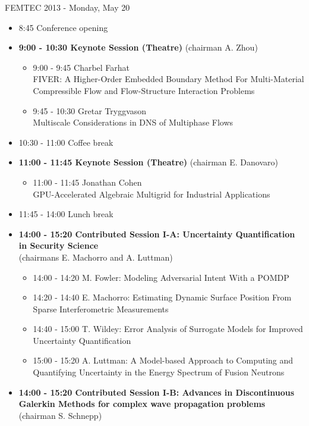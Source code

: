 \documentclass[10pt]{article}%
\begin{document}
\centerline{\huge FEMTEC 2013 - Monday, May 20}
\vspace{4mm}

\begin{itemize}    
  \item 8:45 Conference opening
  \item {\bf 9:00 - 10:30 Keynote Session (Theatre)} (chairman A. Zhou) 
  \begin{itemize}
    \item 9:00 - 9:45 {Charbel Farhat}\\{FIVER: A Higher-Order Embedded Boundary Method For Multi-Material Compressible Flow and Flow-Structure Interaction Problems}
    \item 9:45 - 10:30 {Gretar Tryggvason}\\{Multiscale Considerations in DNS of Multiphase Flows}
  \end{itemize}
  \item 10:30 - 11:00 Coffee break
  \item {\bf 11:00 - 11:45 Keynote Session (Theatre)} (chairman E. Danovaro) 
  \begin{itemize}
    \item 11:00 - 11:45 {Jonathan Cohen}\\{GPU-Accelerated Algebraic Multigrid for Industrial Applications}
  \end{itemize}
  \item 11:45 - 14:00 Lunch break      
  \item {\bf 14:00 - 15:20 Contributed Session I-A: Uncertainty Quantification in Security Science} \\(chairmans E. Machorro and A. Luttman) 
  \begin{itemize}
    \item 14:00 - 14:20 {M. Fowler}: {Modeling Adversarial Intent With a POMDP}
    \item 14:20 - 14:40 {E. Machorro}: {Estimating Dynamic Surface Position From Sparse Interferometric Measurements}
    \item 14:40 - 15:00 {T. Wildey}: {Error Analysis of Surrogate Models for Improved Uncertainty Quantification}
    \item 15:00 - 15:20 {A. Luttman}: {A Model-based Approach to Computing and Quantifying Uncertainty in the Energy Spectrum of Fusion Neutrons}
  \end{itemize}
  \item {\bf 14:00 - 15:20 Contributed Session I-B: Advances in Discontinuous Galerkin Methods for complex wave propagation problems} (chairman S. Schnepp)

\end{itemize}
\end{document}
